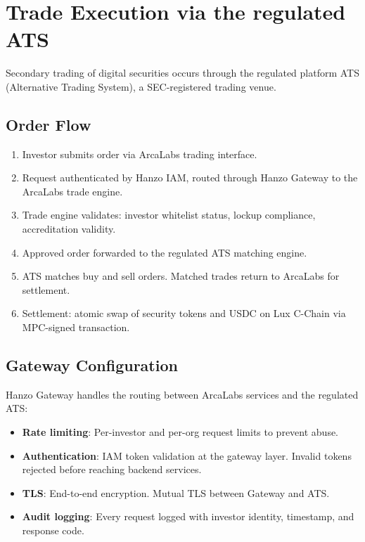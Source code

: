 \section{Trade Execution via the regulated ATS}

\label{sec:trade}

Secondary trading of digital securities occurs through the regulated platform
ATS (Alternative Trading System), a SEC-registered trading venue.

\subsection{Order Flow}

\begin{enumerate}[leftmargin=1.4em]
    \item Investor submits order via ArcaLabs trading interface.
    \item Request authenticated by Hanzo IAM, routed through Hanzo
    Gateway to the ArcaLabs trade engine.
    \item Trade engine validates: investor whitelist status, lockup
    compliance, accreditation validity.
    \item Approved order forwarded to the regulated ATS matching engine.
    \item ATS matches buy and sell orders. Matched trades return to
    ArcaLabs for settlement.
    \item Settlement: atomic swap of security tokens and USDC on Lux
    C-Chain via MPC-signed transaction.
\end{enumerate}

\subsection{Gateway Configuration}

Hanzo Gateway handles the routing between ArcaLabs services and the
regulated ATS:

\begin{itemize}[leftmargin=1.4em]
    \item \textbf{Rate limiting}: Per-investor and per-org request limits
    to prevent abuse.
    \item \textbf{Authentication}: IAM token validation at the gateway
    layer. Invalid tokens rejected before reaching backend services.
    \item \textbf{TLS}: End-to-end encryption. Mutual TLS between
    Gateway and ATS.
    \item \textbf{Audit logging}: Every request logged with investor
    identity, timestamp, and response code.
\end{itemize}

